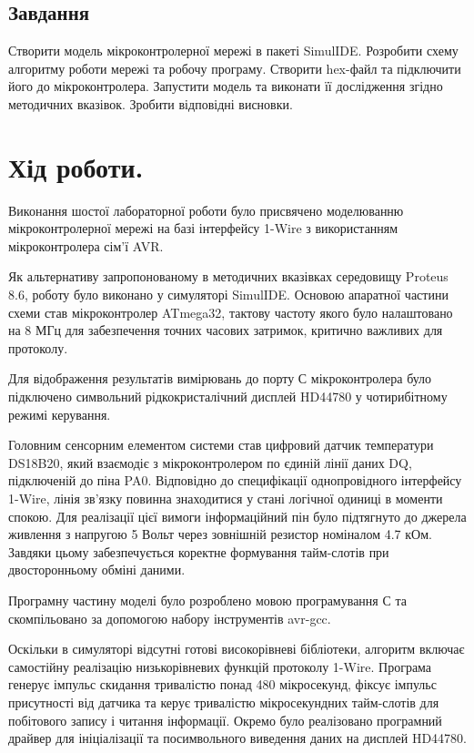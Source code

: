 \documentclass[14pt, a4paper]{extreport}
\begin{document}
	\subsection*{Завдання}
	Створити модель мікроконтролерної мережі в пакеті SimulIDE. Розробити схему алгоритму роботи мережі та робочу програму. Створити hex-файл та підключити його до мікроконтролера. Запустити модель та виконати її дослідження згідно методичних вказівок. Зробити відповідні висновки.
	
	\section*{Хід роботи.}
	
	Виконання шостої лабораторної роботи було присвячено моделюванню мікроконтролерної мережі на базі інтерфейсу 1-Wire з використанням мікроконтролера сім'ї AVR. 
	
	
	Як альтернативу запропонованому в методичних вказівках середовищу Proteus 8.6, роботу було виконано у симуляторі SimulIDE. Основою апаратної частини схеми став мікроконтролер ATmega32, тактову частоту якого було налаштовано на 8 МГц для забезпечення точних часових затримок, критично важливих для протоколу.
	
	
	Для відображення результатів вимірювань до порту С мікроконтролера було підключено символьний рідкокристалічний дисплей HD44780 у чотирибітному режимі керування.
	
	Головним сенсорним елементом системи став цифровий датчик температури DS18B20, який взаємодіє з мікроконтролером по єдиній лінії даних DQ, підключеній до піна PA0. Відповідно до специфікації однопровідного інтерфейсу 1-Wire, лінія зв'язку повинна знаходитися у стані логічної одиниці в моменти спокою. Для реалізації цієї вимоги інформаційний пін було підтягнуто до джерела живлення з напругою 5 Вольт через зовнішній резистор номіналом 4.7 кОм. Завдяки цьому забезпечується коректне формування тайм-слотів при двосторонньому обміні даними.
	
	Програмну частину моделі було розроблено мовою програмування С та скомпільовано за допомогою набору інструментів avr-gcc. 
	
	
	Оскільки в симуляторі відсутні готові високорівневі бібліотеки, алгоритм включає самостійну реалізацію низькорівневих функцій протоколу 1-Wire. Програма генерує імпульс скидання тривалістю понад 480 мікросекунд, фіксує імпульс присутності від датчика та керує тривалістю мікросекундних тайм-слотів для побітового запису і читання інформації. Окремо було реалізовано програмний драйвер для ініціалізації та посимвольного виведення даних на дисплей HD44780.
	
\end{document}
